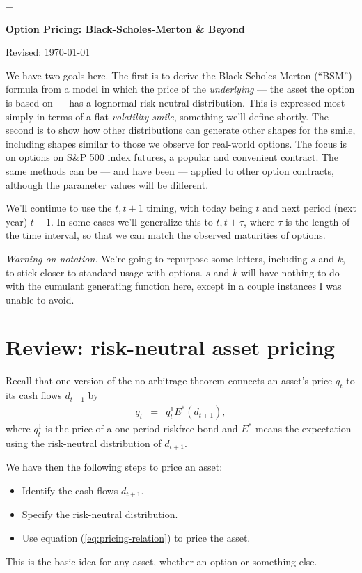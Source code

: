 \documentclass[11pt]{article}
\begin{document}
\parskip=\bigskipamount
\parindent=0.0in
\thispagestyle{empty}


\bigskip\bigskip
\centerline{\Large \bf Option Pricing: Black-Scholes-Merton \& Beyond}
\centerline{Revised: \today}

\bigskip
We have two goals here.
The first is to derive the Black-Scholes-Merton (``BSM'') formula from a model
in which the price of the {\it underlying\/} ---
the asset the option is based on ---
has a lognormal risk-neutral distribution.
This is expressed most simply in terms of a flat {\it volatility smile\/},
something we'll define shortly.
The second is to show how other distributions can generate other
shapes for the smile, including shapes similar to those
we observe for real-world options.
The focus is on options on S\&P 500 index futures,
a popular and convenient contract.
The same methods can be --- and have been ---
applied to other option contracts,
although the parameter values will be different.


We'll continue to use the $t, t+1$ timing,
with today being $t$ and next period (next year) $t+1$.
In some cases we'll generalize this to $t,t+\tau$,
where $\tau$ is the length of the time interval,
so that we can match the observed maturities of options.

{\it Warning on notation.\/}
We're going to repurpose some letters, including $s$ and $k$,
to stick closer to standard usage with options.
$s$ and $k$ will have nothing to do with the cumulant generating function here,
except in a couple instances I was unable to avoid.

\section{Review:  risk-neutral asset pricing}

Recall that one version of the no-arbitrage theorem connects an asset's price $q_t$
to its cash flows $d_{t+1}$ by
\begin{eqnarray}
    q_t &=& q^1_t E^* \left( d_{t+1} \right) ,
    \label{eq:pricing-relation}
\end{eqnarray}
where $q^1_t$ is the price of a one-period riskfree bond
and $E^*$ means the expectation using the risk-neutral distribution
of $d_{t+1}$.

We have then the following steps to price an asset:
\begin{itemize}
\item Identify the cash flows $d_{t+1}$.
\item Specify the risk-neutral distribution.
\item Use equation (\ref{eq:pricing-relation}) to price the asset.
\end{itemize}
This is the basic idea for any asset,
whether an option or something else.
\end{document}
